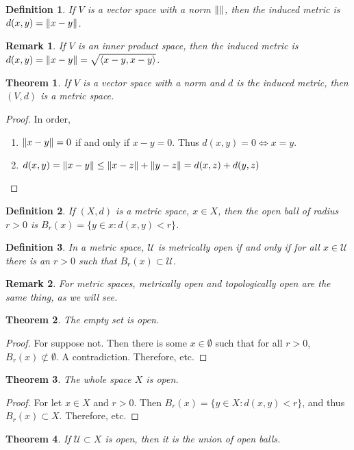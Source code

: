 \documentclass[crop=false,class=book]{standalone}
\theoremstyle{mystyle}
\newtheorem{theorem}{Theorem}[section]
\newtheorem{definition}{Definition}[section]
\newtheorem{remark}{Remark}[section]
\DeclarePairedDelimiter\norm{\lVert}{\rVert}
\begin{document}
\begin{definition}
If $V$ is a vector space with a norm $\norm{}$, then the induced metric is $d(x,y) = \norm{x-y}$.
\end{definition}
\begin{remark}
If $V$ is an inner product space, then the induced metric is $d(x,y) = \norm{x-y} = \sqrt{\langle x-y,x-y\rangle }$.
\end{remark}
\begin{theorem}
If $V$ is a vector space with a norm and $d$ is the induced metric, then $(V,d)$ is a metric space.
\end{theorem}
\begin{proof}
In order,
\begin{enumerate}
\item $\norm{x-y} = 0$ if and only if $x-y = 0$. Thus $d(x,y) = 0 \Leftrightarrow x=y$.
\item $d(x,y) = \norm{x-y}\leq \norm{x-z}+\norm{y-z} = d(x,z)+d(y,z)$
\end{enumerate}
\end{proof}
\begin{definition}
If $(X,d)$ is a metric space, $x\in X$, then the open ball of radius $r>0$ is $B_{r}(x) = \{y\in x: d(x,y)<r\}$.
\end{definition}
\begin{definition}
In a metric space, $\mathcal{U}$ is metrically open if and only if for all $x\in \mathcal{U}$ there is an $r>0$ such that $B_{r}(x)\subset \mathcal{U}$.
\end{definition}
\begin{remark}
For metric spaces, metrically open and topologically open are the same thing, as we will see.
\end{remark} 
\begin{theorem}
The empty set is open.
\end{theorem}
\begin{proof}
For suppose not. Then there is some $x\in \emptyset$ such that for all $r>0$, $B_{r}(x)\not\subset \emptyset$. A contradiction. Therefore, etc.
\end{proof}
\begin{theorem}
The whole space $X$ is open.
\end{theorem}
\begin{proof}
For let $x\in X$ and $r>0$. Then $B_{r}(x) = \{y\in X:d(x,y)<r\}$, and thus $B_{r}(x)\subset X$. Therefore, etc.
\end{proof}
\begin{theorem}
If $\mathcal{U}\subset X$ is open, then it is the union of open balls.
\end{theorem}
\end{document}
